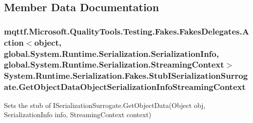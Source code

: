 \subsection{Member Data Documentation}
\hypertarget{class_system_1_1_runtime_1_1_serialization_1_1_fakes_1_1_stub_i_serialization_surrogate_a2b538daf3631cbdfd38369b89b0d313e}{
\subsubsection[{Get\-Object\-Data\-Object\-Serialization\-Info\-Streaming\-Context}]{\setlength{\rightskip}{0pt plus 5cm}mqttf.\-Microsoft.\-Quality\-Tools.\-Testing.\-Fakes.\-Fakes\-Delegates.\-Action$<$object, global.\-System.\-Runtime.\-Serialization.\-Serialization\-Info, global.\-System.\-Runtime.\-Serialization.\-Streaming\-Context$>$ System.\-Runtime.\-Serialization.\-Fakes.\-Stub\-I\-Serialization\-Surrogate.\-Get\-Object\-Data\-Object\-Serialization\-Info\-Streaming\-Context}}\label{class_system_1_1_runtime_1_1_serialization_1_1_fakes_1_1_stub_i_serialization_surrogate_a2b538daf3631cbdfd38369b89b0d313e}


Sets the stub of I\-Serialization\-Surrogate.\-Get\-Object\-Data(\-Object obj, Serialization\-Info info, Streaming\-Context context)

